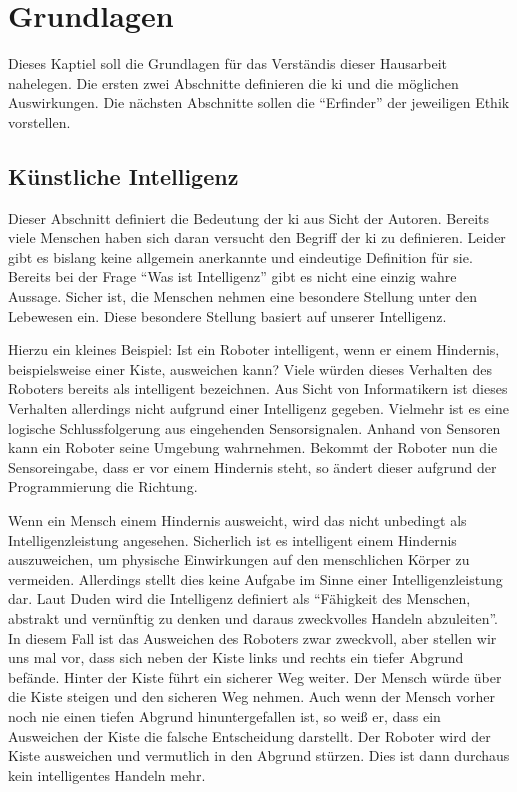 \section{Grundlagen}
Dieses Kaptiel soll die Grundlagen für das Verständis dieser Hausarbeit nahelegen. Die ersten zwei Abschnitte definieren die \ac{ki} und die möglichen Auswirkungen. Die nächsten Abschnitte sollen die \enquote{Erfinder} der jeweiligen Ethik vorstellen. 

\subsection{Künstliche Intelligenz}
Dieser Abschnitt definiert die Bedeutung der \ac{ki} aus Sicht der Autoren. Bereits viele Menschen haben sich daran versucht den Begriff der \ac{ki} zu definieren. Leider gibt es bislang keine allgemein anerkannte und eindeutige Definition für sie. Bereits bei der Frage \enquote{Was ist Intelligenz} gibt es nicht eine einzig wahre Aussage. Sicher ist, die Menschen nehmen eine besondere Stellung unter den Lebewesen ein. Diese besondere Stellung basiert auf unserer Intelligenz.

Hierzu ein kleines Beispiel: Ist ein Roboter intelligent, wenn er einem Hindernis, beispielsweise einer Kiste, ausweichen kann?  Viele würden dieses Verhalten des Roboters bereits als intelligent bezeichnen. Aus Sicht von Informatikern ist dieses Verhalten allerdings nicht aufgrund einer Intelligenz gegeben. Vielmehr ist es eine logische Schlussfolgerung aus eingehenden Sensorsignalen. Anhand von Sensoren kann ein Roboter seine Umgebung wahrnehmen. Bekommt der Roboter nun die Sensoreingabe, dass er vor einem Hindernis steht, so ändert dieser aufgrund der Programmierung die Richtung. 

Wenn ein Mensch einem Hindernis ausweicht, wird das nicht unbedingt als Intelligenzleistung angesehen. Sicherlich ist es intelligent einem Hindernis auszuweichen, um physische Einwirkungen auf den menschlichen Körper zu vermeiden. Allerdings stellt dies keine Aufgabe im Sinne einer Intelligenzleistung dar. Laut Duden wird die Intelligenz definiert als \enquote{Fähigkeit des Menschen, abstrakt und vernünftig zu denken und daraus zweckvolles Handeln abzuleiten}. %
In diesem Fall ist das Ausweichen des Roboters zwar zweckvoll, aber stellen wir uns mal vor, dass sich neben der Kiste links und rechts ein tiefer Abgrund befände. Hinter der Kiste führt ein sicherer Weg weiter. Der Mensch würde über die Kiste steigen und den sicheren Weg nehmen. Auch wenn der Mensch vorher noch nie einen tiefen Abgrund hinuntergefallen ist, so weiß er, dass ein Ausweichen der Kiste die falsche Entscheidung darstellt. Der Roboter  wird der Kiste ausweichen und vermutlich in den Abgrund stürzen. Dies ist dann durchaus kein intelligentes Handeln mehr. 

